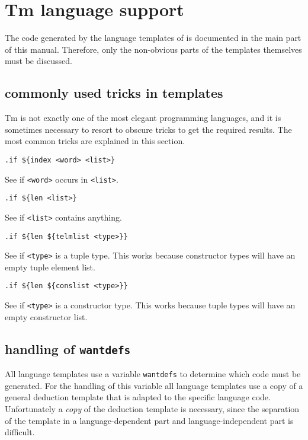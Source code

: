 \section{Tm language support}
The code generated by the language templates of {\Tm} is documented
in the main part of this manual.
Therefore, only the non-obvious parts of the templates themselves
must be discussed.
\subsection{commonly used tricks in templates}
Tm is not exactly one of the most elegant programming languages,
and it is sometimes necessary to resort to obscure tricks to get the
required results.
The most common tricks are explained in this section.
\begin{verbatim}
.if ${index <word> <list>}
\end{verbatim}
See if \verb!<word>! occurs in \verb!<list>!.
\begin{verbatim}
.if ${len <list>}
\end{verbatim}
See if \verb!<list>! contains anything.
\begin{verbatim}
.if ${len ${telmlist <type>}}
\end{verbatim}
See if \verb!<type>! is a tuple type.
This works because constructor types will have an empty tuple
element list.
\begin{verbatim}
.if ${len ${conslist <type>}}
\end{verbatim}
See if \verb!<type>! is a constructor type.
This works because tuple types will have an empty constructor list.
\subsection{handling of \texttt{wantdefs}}
All language templates use a variable \texttt{wantdefs} to determine
which code must be generated.  For the handling of this variable all
language templates use a copy of a general deduction template that is
adapted to the specific language code.  Unfortunately a \emph{copy} of
the deduction template is necessary, since the separation of the template
in a language-dependent part and language-independent part is difficult.

